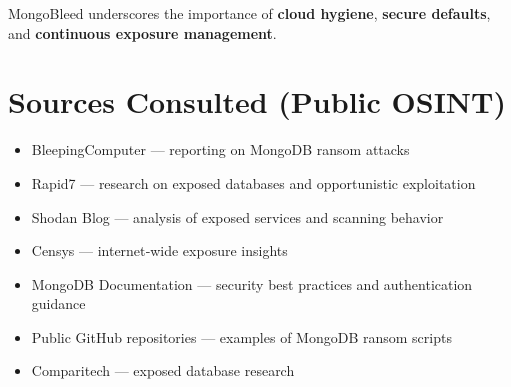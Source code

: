 \documentclass[12pt]{article}
\begin{document}
	MongoBleed underscores the importance of \textbf{cloud hygiene}, \textbf{secure defaults}, and \textbf{continuous exposure management}.
	
	\section*{Sources Consulted (Public OSINT)}
	
	\begin{itemize}
		\item BleepingComputer — reporting on MongoDB ransom attacks  
		\item Rapid7 — research on exposed databases and opportunistic exploitation  
		\item Shodan Blog — analysis of exposed services and scanning behavior  
		\item Censys — internet‑wide exposure insights  
		\item MongoDB Documentation — security best practices and authentication guidance  
		\item Public GitHub repositories — examples of MongoDB ransom scripts  
		\item Comparitech — exposed database research  
	\end{itemize}
	
\end{document}
